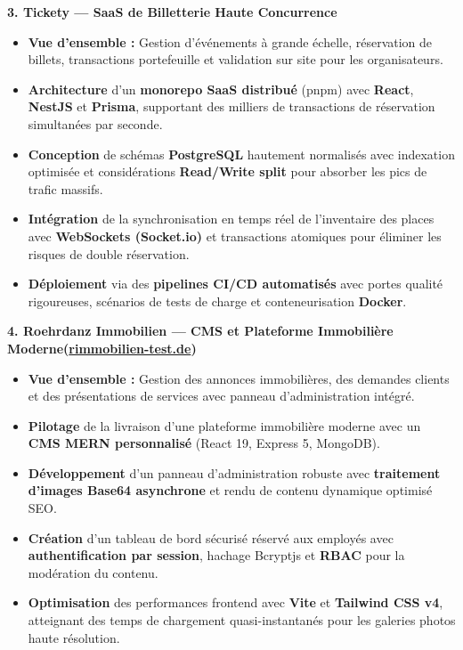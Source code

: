 \documentclass[10pt, letterpaper]{article}
\newenvironment{highlights}{
\begin{itemize}[leftmargin=12pt, itemsep=2pt]
}{
\end{itemize}
}
\begin{document}
\textbf{3. Tickety --- SaaS de Billetterie Haute Concurrence}
\begin{highlights}
\item \textbf{Vue d'ensemble :} Gestion d'événements à grande échelle, réservation de billets, transactions portefeuille et validation sur site pour les organisateurs.
\item \textbf{Architecture} d'un \textbf{monorepo SaaS distribué} (pnpm) avec \textbf{React}, \textbf{NestJS} et \textbf{Prisma}, supportant des milliers de transactions de réservation simultanées par seconde.
\item \textbf{Conception} de schémas \textbf{PostgreSQL} hautement normalisés avec indexation optimisée et considérations \textbf{Read/Write split} pour absorber les pics de trafic massifs.
\item \textbf{Intégration} de la synchronisation en temps réel de l'inventaire des places avec \textbf{WebSockets (Socket.io)} et transactions atomiques pour éliminer les risques de double réservation.
\item \textbf{Déploiement} via des \textbf{pipelines CI/CD automatisés} avec portes qualité rigoureuses, scénarios de tests de charge et conteneurisation \textbf{Docker}.
\end{highlights}

\textbf{4. Roehrdanz Immobilien --- CMS et Plateforme Immobilière Moderne(\href{https://rimmobilien-test.de}{rimmobilien-test.de})}
\begin{highlights}
\item \textbf{Vue d'ensemble :} Gestion des annonces immobilières, des demandes clients et des présentations de services avec panneau d'administration intégré.
\item \textbf{Pilotage} de la livraison d'une plateforme immobilière moderne avec un \textbf{CMS MERN personnalisé} (React 19, Express 5, MongoDB).
\item \textbf{Développement} d'un panneau d'administration robuste avec \textbf{traitement d'images Base64 asynchrone} et rendu de contenu dynamique optimisé SEO.
\item \textbf{Création} d'un tableau de bord sécurisé réservé aux employés avec \textbf{authentification par session}, hachage Bcryptjs et \textbf{RBAC} pour la modération du contenu.
\item \textbf{Optimisation} des performances frontend avec \textbf{Vite} et \textbf{Tailwind CSS v4}, atteignant des temps de chargement quasi-instantanés pour les galeries photos haute résolution.
\end{highlights}
\end{document}
